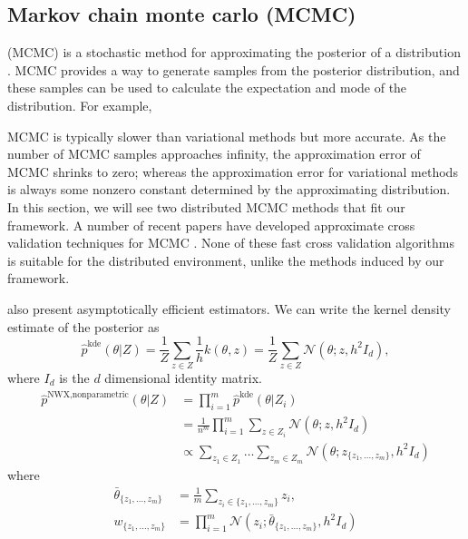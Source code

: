 \documentclass[thesis.tex]{subfiles}
\newcommand{\eye}[1]{I_{#1}}
\newcommand{\psup}[2]{\hat p^{#1}({#2})}
\newcommand{\pkde}[1]{\psup{\text{kde}}{#1}}
\newcommand{\pnp}[1]{\psup{\text{NWX,nonparametric}}{#1}}
\newcommand{\gaussian}[3]{\mathcal N({#1};{#2},{#3})}
\begin{document}

\subsection{Markov chain monte carlo (MCMC)}
\label{sec:merge:mcmc}

 (MCMC) is a stochastic method for approximating the posterior of a distribution \citep{andrieu2003introduction}.
MCMC provides a way to generate samples from the posterior distribution,
and these samples can be used to calculate the expectation and mode of the distribution.
For example,

MCMC is typically slower than variational methods but more accurate.
As the number of MCMC samples approaches infinity,
the approximation error of MCMC shrinks to zero;
whereas the approximation error for variational methods is always some nonzero constant determined by the approximating distribution.
In this section, we will see two distributed MCMC methods that fit our framework.
A number of recent papers have developed approximate cross validation techniques for MCMC
\citep{marshall2003approximate,
bhattacharya2007importance,
bornn2010efficient,
held2010posterior,
vehtari2012survey,
li2016approximating}.
None of these fast cross validation algorithms is suitable for the distributed environment,
unlike the methods induced by our framework.


\cite{neiswanger2014asymptotically} also present asymptotically efficient estimators.
We can write the kernel density estimate of the posterior as
\begin{equation}
    \pkde{\theta|Z}
    =
    \frac{1}{Z}\sum_{z\in Z}
    \frac{1}{h}k(\theta,z)
    =
    \frac{1}{Z}\sum_{z\in Z}
    \gaussian{\theta}{z}{h^2 \eye d}
    ,
\end{equation}
where $\eye d$ is the $d$ dimensional identity matrix.
\begin{align}
    \pnp{\theta|Z}
    &=
    \prod_{i=1}^m \pkde{\theta|Z_i}
    \\
    &=
    \frac{1}{n^m}
    \prod_{i=1}^m 
    \sum_{z\in Z_i}
    \gaussian{\theta}{z}{h^2 \eye d}
    \\
    &\propto
    \sum_{z_1\in Z_1}
    \dots
    \sum_{z_m\in Z_m}
    \gaussian{\theta}{z_{\{z_1,...,z_m\}}}{h^2 \eye d}
\end{align}
where
\begin{align}
    \bar\theta_{\{z_1,...,z_m\}} 
    &= 
    \frac{1}{m}\sum_{z_i\in\{z_1,...,z_m\}} z_i
    ,
    \\
    w_{\{z_1,...,z_m\}} 
    &=
    \prod_{i=1}^m\gaussian{z_i}{\bar\theta_{\{z_1,...,z_m\}}}{h^2\eye d}
\end{align}
\end{document}
